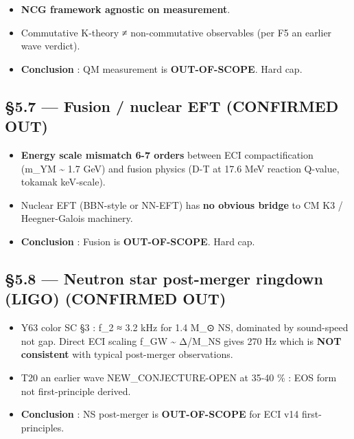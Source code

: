 \documentclass[
  11pt,
  a4paper,
]{article}
\providecommand{\tightlist}{\setlength{\itemsep}{0pt}\setlength{\parskip}{0pt}}
\providecommand{\tightlist}{%
  \setlength{\itemsep}{0pt}\setlength{\parskip}{0pt}}
\begin{document}
\begin{itemize}
\tightlist
\item
  \textbf{NCG framework agnostic on measurement}.
\item
  Commutative K-theory ≠ non-commutative observables (per F5 an earlier wave verdict).
\item
  \textbf{Conclusion} : QM measurement is \textbf{OUT-OF-SCOPE}. Hard cap.
\end{itemize}

\hypertarget{fusion-nuclear-eft-confirmed-out}{%
\subsection{§5.7 --- Fusion / nuclear EFT (CONFIRMED OUT)}\label{fusion-nuclear-eft-confirmed-out}}

\begin{itemize}
\tightlist
\item
  \textbf{Energy scale mismatch 6-7 orders} between ECI compactification (m\_YM \textasciitilde{} 1.7 GeV) and fusion physics (D-T at 17.6 MeV reaction Q-value, tokamak keV-scale).
\item
  Nuclear EFT (BBN-style or NN-EFT) has \textbf{no obvious bridge} to CM K3 / Heegner-Galois machinery.
\item
  \textbf{Conclusion} : Fusion is \textbf{OUT-OF-SCOPE}. Hard cap.
\end{itemize}

\hypertarget{neutron-star-post-merger-ringdown-ligo-confirmed-out}{%
\subsection{§5.8 --- Neutron star post-merger ringdown (LIGO) (CONFIRMED OUT)}\label{neutron-star-post-merger-ringdown-ligo-confirmed-out}}

\begin{itemize}
\tightlist
\item
  Y63 color SC §3 : f\_2 ≈ 3.2 kHz for 1.4 M\_⊙ NS, dominated by sound-speed not gap. Direct ECI scaling f\_GW \textasciitilde{} Δ/M\_NS gives 270 Hz which is \textbf{NOT consistent} with typical post-merger observations.
\item
  T20 an earlier wave NEW\_CONJECTURE-OPEN at 35-40 \% : EOS form not first-principle derived.
\item
  \textbf{Conclusion} : NS post-merger is \textbf{OUT-OF-SCOPE} for ECI v14 first-principles.
\end{itemize}
\end{document}
